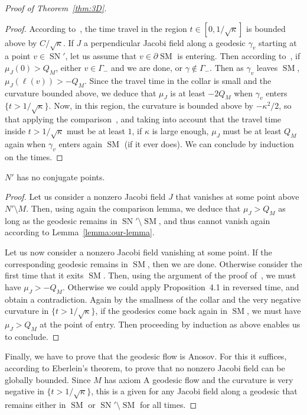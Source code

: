 \documentclass[AHL,Unicode,longabstracts,published]{cedram}
\DeclareMathOperator{\SM}{SM}
\DeclareMathOperator{\SN}{SN}
\theoremstyle{plain}
\begin{document}
\begin{proof}[Proof of Theorem~\ref{thm:3D}]
\begin{proof}
According to~\cite[Lemma~8.5]{Chen-Erchenko-Gogolev}, the time travel in the region $t\in [0,1/\sqrt{\kappa}]$ is bounded above by $C/\sqrt{\kappa}$. If $J$ a perpendicular Jacobi field along a geodesic $\gamma_v$ starting at a point $v\in \SN'$, let us assume that $v\in \partial \SM$ is entering. Then according to~\cite[Proposition~4.1]{Chen-Erchenko-Gogolev}, if $\mu_J(0) > Q_M$, either $v\in\Gamma_-$ and we are done, or $\gamma\notin \Gamma_-$. Then as $\gamma_v$ leaves $\SM$, $\mu_J(\ell(v)) > - Q_M$. Since the travel time in the collar is small and the curvature bounded above, we deduce that $\mu_J$ is at least $-2Q_M$ when $\gamma_v$ enters $\{t>1/\sqrt{\kappa}\}$. Now, in this region, the curvature is bounded above by $-\kappa^2/2$, so that applying the comparison~\cite[Lemma~2.8]{Chen-Erchenko-Gogolev}, and taking into account that the travel time inside $t>1/\sqrt{\kappa}$ must be at least $1$, if $\kappa$ is large enough, $\mu_J$ must be at least $Q_M$ again when $\gamma_v$ enters again $\SM$ (if it ever does). We can conclude by induction on the times.
\end{proof}

\begin{lemm}
$N'$ has no conjugate points.
\end{lemm}

\begin{proof}
Let us consider a nonzero Jacobi field $J$ that vanishes at some point above $N'\setminus M$. Then, using again the comparison lemma, we deduce that $\mu_J> Q_M$ as long as the geodesic remains in $\SN'\setminus \SM$, and thus cannot vanish again according to Lemma~\ref{lemma:our-lemma}.

Let us now consider a nonzero Jacobi field vanishing at some point. If the corresponding geodesic remains in $\SM$, then we are done. Otherwise consider the first time that it exits $\SM$. Then, using the argument of the proof of~\cite[Lemma~8.11]{Chen-Erchenko-Gogolev}, we must have $\mu_J> - Q_M$. Otherwise we could apply Proposition~4.1 in reversed time, and obtain a contradiction. Again by the smallness of the collar and the very negative curvature in $\{t>1/\sqrt{\kappa}\}$, if the geodesics come back again in $\SM$, we must have $\mu_J> Q_M$ at the point of entry. Then proceeding by induction as above enables us to conclude.
\end{proof}

Finally, we have to prove that the geodesic flow is Anosov. For this it suffices, according to Eberlein's theorem, to prove that no nonzero Jacobi field can be globally bounded. Since $M$ has axiom A geodesic flow and the curvature is very negative in $\{t>1/\sqrt{\kappa}\}$, this is a given for any Jacobi field along a geodesic that remains either in $\SM$ or $\SN'\setminus \SM$ for all times.


\end{proof}
\end{document}
